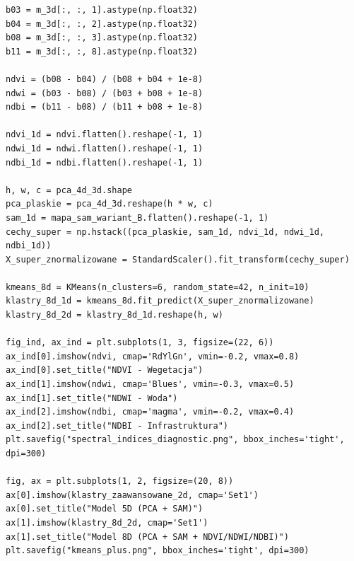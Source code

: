 \documentclass[12pt,a4paper]{article}
\begin{document}
\begin{lstlisting}[caption={Obliczenie NDVI, NDWI, NDBI i segmentacja 8D.},label={lst:indices}]
b03 = m_3d[:, :, 1].astype(np.float32)
b04 = m_3d[:, :, 2].astype(np.float32)
b08 = m_3d[:, :, 3].astype(np.float32)
b11 = m_3d[:, :, 8].astype(np.float32)

ndvi = (b08 - b04) / (b08 + b04 + 1e-8)
ndwi = (b03 - b08) / (b03 + b08 + 1e-8)
ndbi = (b11 - b08) / (b11 + b08 + 1e-8)

ndvi_1d = ndvi.flatten().reshape(-1, 1)
ndwi_1d = ndwi.flatten().reshape(-1, 1)
ndbi_1d = ndbi.flatten().reshape(-1, 1)

h, w, c = pca_4d_3d.shape
pca_plaskie = pca_4d_3d.reshape(h * w, c)
sam_1d = mapa_sam_wariant_B.flatten().reshape(-1, 1)
cechy_super = np.hstack((pca_plaskie, sam_1d, ndvi_1d, ndwi_1d, ndbi_1d))
X_super_znormalizowane = StandardScaler().fit_transform(cechy_super)

kmeans_8d = KMeans(n_clusters=6, random_state=42, n_init=10)
klastry_8d_1d = kmeans_8d.fit_predict(X_super_znormalizowane)
klastry_8d_2d = klastry_8d_1d.reshape(h, w)

fig_ind, ax_ind = plt.subplots(1, 3, figsize=(22, 6))
ax_ind[0].imshow(ndvi, cmap='RdYlGn', vmin=-0.2, vmax=0.8)
ax_ind[0].set_title("NDVI - Wegetacja")
ax_ind[1].imshow(ndwi, cmap='Blues', vmin=-0.3, vmax=0.5)
ax_ind[1].set_title("NDWI - Woda")
ax_ind[2].imshow(ndbi, cmap='magma', vmin=-0.2, vmax=0.4)
ax_ind[2].set_title("NDBI - Infrastruktura")
plt.savefig("spectral_indices_diagnostic.png", bbox_inches='tight', dpi=300)

fig, ax = plt.subplots(1, 2, figsize=(20, 8))
ax[0].imshow(klastry_zaawansowane_2d, cmap='Set1')
ax[0].set_title("Model 5D (PCA + SAM)")
ax[1].imshow(klastry_8d_2d, cmap='Set1')
ax[1].set_title("Model 8D (PCA + SAM + NDVI/NDWI/NDBI)")
plt.savefig("kmeans_plus.png", bbox_inches='tight', dpi=300)
\end{lstlisting}
\end{document}
